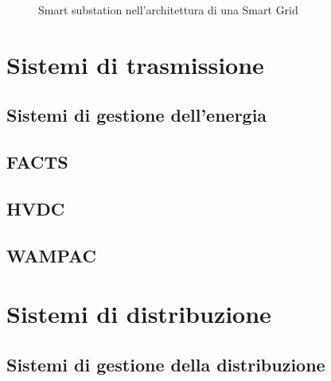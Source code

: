 \begin{figure}[h] 
\caption{Smart substation nell'architettura di una Smart Grid}\label{fig:9}
\end{figure}


\section{Sistemi di trasmissione}

\subsection{Sistemi di gestione dell'energia}
\subsection{FACTS}
\subsection{HVDC}
\subsection{WAMPAC}


\section{Sistemi di distribuzione}

\subsection{Sistemi di gestione della distribuzione}
